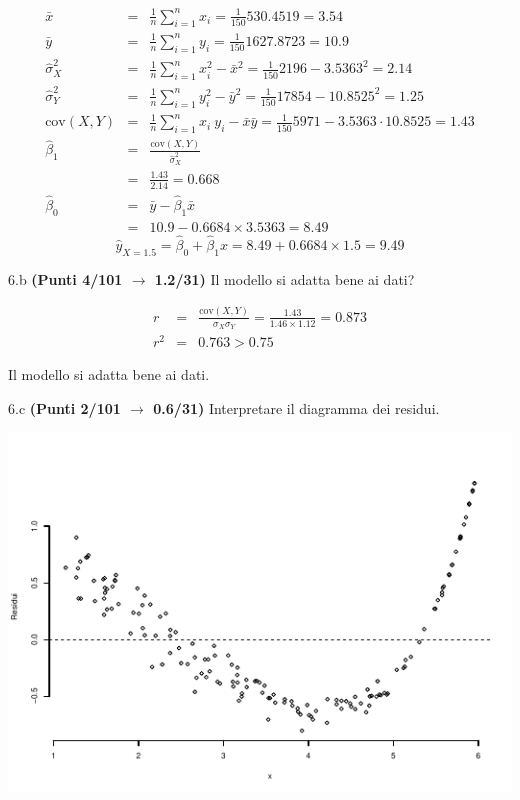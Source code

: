 \documentclass[
  11pt,
]{book}
\theoremstyle{mytheoremstyle}
\theoremstyle{mydefstyle}
\newenvironment{sol}
  {
  \begin{tcolorbox}[enhanced,breakable,arc=0.1mm,boxrule=1pt,colback=white,colframe=iblue,
  title=\bf \fontfamily{lmss}\selectfont \hspace{.5 cm} Soluzione,drop fuzzy shadow]

}{
\end{tcolorbox}
  }
\begin{document}
\begin{sol}
\begin{eqnarray*}
           \bar x &=&\frac 1 n\sum_{i=1}^n x_i = \frac {1}{ 150 }  530.4519 =  3.54 \\
           \bar y &=&\frac 1 n\sum_{i=1}^n y_i = \frac {1}{ 150 }  1627.8723 =  10.9 \\
           \hat\sigma_X^2&=&\frac 1 n\sum_{i=1}^n x_i^2-\bar x^2=\frac {1}{ 150 }  2196  - 3.5363 ^2= 2.14 \\
           \hat\sigma_Y^2&=&\frac 1 n\sum_{i=1}^n y_i^2-\bar y^2=\frac {1}{ 150 }  17854  - 10.8525 ^2= 1.25 \\
           \text{cov}(X,Y)&=&\frac 1 n\sum_{i=1}^n x_i~y_i-\bar x\bar y=\frac {1}{ 150 }  5971 - 3.5363 \cdot 10.8525 = 1.43 \\
           \hat\beta_1 &=& \frac{\text{cov}(X,Y)}{\hat\sigma_X^2} \\
                    &=& \frac{ 1.43 }{ 2.14 }  =  0.668 \\
           \hat\beta_0 &=& \bar y - \hat\beta_1 \bar x\\
                    &=&  10.9 - 0.6684 \times  3.5363 = 8.49 
         \end{eqnarray*}\[\hat y_{X= 1.5 }=\hat\beta_0+\hat\beta_1 x= 8.49 + 0.6684 \times 1.5 = 9.49 \]

\end{sol}

6.b \textbf{(Punti 4/101 \(\rightarrow\) 1.2/31)} Il modello si adatta bene ai dati?

\begin{sol}
\begin{eqnarray*}
r&=&\frac{\text{cov}(X,Y)}{\sigma_X\sigma_Y}=\frac{ 1.43 }{ 1.46 \times 1.12 }= 0.873 \\ 
r^2&=& 0.763 > 0.75
\end{eqnarray*}

Il modello si adatta bene ai dati.

\end{sol}

6.c \textbf{(Punti 2/101 \(\rightarrow\) 0.6/31)} Interpretare il diagramma dei residui.

\begin{center}\includegraphics{Esami_passati_con_soluzioni_files/figure-latex/2023-25,-1} \end{center}
\end{document}
